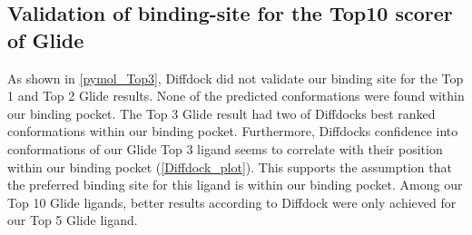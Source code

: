 \documentclass[11pt, letterpaper, titlepage]{article}
\begin{document}
\subsection{Validation of binding-site for the Top10 scorer of Glide}
As shown in \autoref{pymol_Top3}, Diffdock did not validate our binding site for the Top 1 and Top 2 Glide results. None of the predicted conformations were found within our binding pocket. The Top 3 Glide result had two of Diffdocks best ranked conformations within our binding pocket. Furthermore, Diffdocks confidence into conformations of our Glide Top 3 ligand seems to correlate with their position within our binding pocket (\autoref{Diffdock_plot}). This supports the assumption that the preferred binding site for this ligand is within our binding pocket. Among our Top 10 Glide ligands, better results according to Diffdock were only achieved for our Top 5 Glide ligand.
\end{document}
